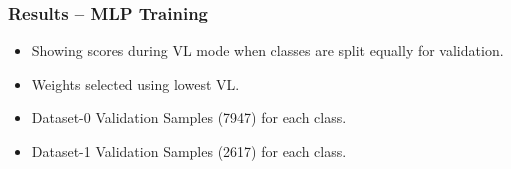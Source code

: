 \documentclass{beamer}
\begin{document}
\begin{frame}
  \frametitle{Results -- MLP Training}

\begin{figure}
  
\hspace{0.1cm}%
  
\end{figure}

\scriptsize
 \begin{itemize}
 \item Showing scores during VL mode when classes are split equally for 
validation.
\item Weights selected using lowest VL.
 \item Dataset-0 Validation Samples (7947) for each class.
  \item Dataset-1 Validation Samples (2617) for each class.
 \end{itemize}


\end{frame}
\end{document}
